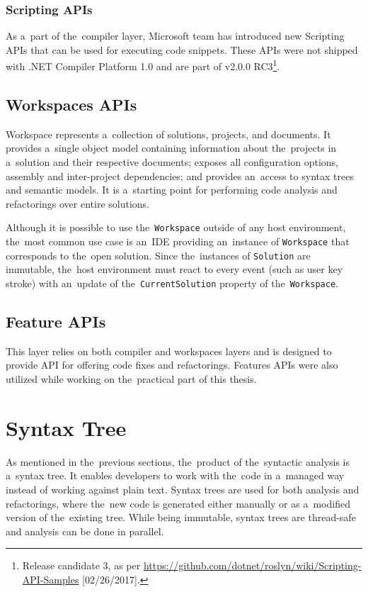 \documentclass[
  digital, %
  table,   %
  lof,     %
  lot,     %
  oneside,
]{fithesis3}
\begin{document}
\subsubsection{\textbf{Scripting APIs}}
As a~part of the~compiler layer, Microsoft team has introduced new Scripting APIs that can be used for executing code snippets. These APIs were not shipped with .NET Compiler Platform 1.0 and are part of v2.0.0 RC3\footnote{Release candidate 3, as per \url{https://github.com/dotnet/roslyn/wiki/Scripting-API-Samples} [02/26/2017].}.

\subsection{Workspaces APIs}
Workspace represents a~collection of solutions, projects, and documents. It provides a~single object model containing information about the~projects in a~solution and their respective documents; exposes all configuration options, assembly and inter-project dependencies; and provides an~access to syntax trees and semantic models. It is a~starting point for performing code analysis and refactorings over entire solutions.

Although it is possible to use the~\texttt{Workspace} outside of any host environment, the~most common use case is an~IDE providing an~instance of \texttt{Workspace} that corresponds to the~open solution. Since the~instances of \texttt{Solution} are immutable, the~host environment must react to every event (such as user key stroke) with an~update of the~\texttt{CurrentSolution} property of the~\texttt{Workspace}.

\subsection{Feature APIs}
This layer relies on both compiler and workspaces layers and is designed to provide API for offering code fixes and refactorings. Features APIs were also utilized while working on the~practical part of this thesis.
  
\section{Syntax Tree}
As mentioned in the~previous sections, the~product of the~syntactic analysis is a~syntax tree. It enables developers to work with the~code in a~managed way instead of working against plain text. Syntax trees are used for both analysis and refactorings, where the~new code is generated either manually or as a~modified version of the~existing tree. While being immutable, syntax trees are thread-safe and analysis can be done in parallel.
\end{document}
